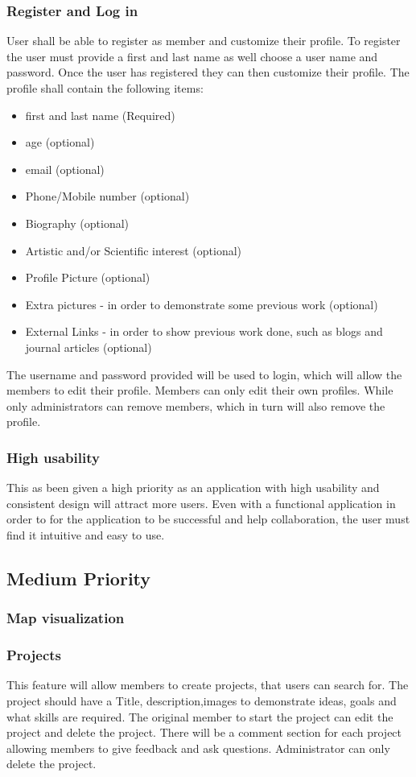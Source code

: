\documentclass[a4paper,oneside,11pt]{report}
\begin{document}
\subsubsection{Register and Log in} 
 User shall be able to register as member and customize their profile. To register the user must provide a first and last name as well choose a user name and password. Once the user has registered they can then customize their profile. The profile shall contain the following items:
 \begin{itemize}
 \item first and last name (Required)
 \item age (optional)
 \item email (optional)
 \item Phone/Mobile number (optional)
 \item Biography (optional)
 \item Artistic and/or Scientific interest (optional)
 \item Profile Picture (optional)
 \item Extra pictures - in order to demonstrate some previous work (optional)
 \item External Links - in order to show previous work done, such as blogs and journal articles (optional)
 \end{itemize}
 The username and password provided will be used to login, which will allow the members to edit their profile.
 	Members can only edit their own profiles. While only administrators can remove members, which in turn will also remove the profile.

\subsubsection{High usability} 
This as been given a high priority as an application with high usability and consistent design will attract more users. Even with a functional application in order to for the application to be successful and help collaboration, the user must find it intuitive and easy to use.
\subsection{Medium Priority}
\subsubsection{Map visualization}
\subsubsection{Projects}
This feature will allow members to create projects, that users can search for. The project should have a Title, description,images to demonstrate ideas, goals and what skills are required. The original member to start the project can edit the project and delete the project. There will be a comment section for each project allowing members to give feedback and ask questions. Administrator can only delete the project.
\end{document}
